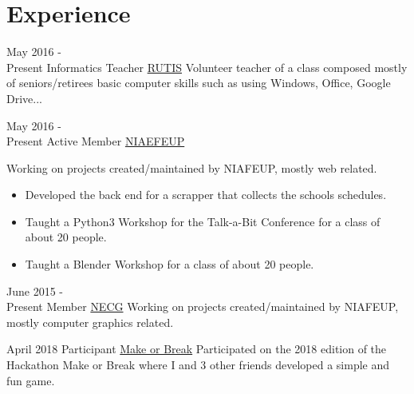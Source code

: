 \documentclass[letterpaper]{twentysecondcv} %
\begin{document}
\section{Experience}




\begin{twenty} %

	\twentyitem
    	{May 2016 - \\ Present}
        {Informatics Teacher}
        {\href{http://www.rutis.pt/intro/home}{RUTIS}}
        {}
        {
        Volunteer teacher of a class composed mostly of seniors/retirees basic computer skills such as using Windows, Office, Google Drive... \newline
        }



	\twentyitem
    	{May 2016 - \\ Present}
        {Active Member}
        {\href{https://ni.fe.up.pt/}{NIAEFEUP}}
        {}
        {
        Working on projects created/maintained by NIAFEUP, mostly web related. \newline
        {\begin{itemize}
        \item Developed the back end for a scrapper that collects the schools schedules. 
        \item Taught a Python3 Workshop for the Talk-a-Bit Conference for a class of about 20 people.
		\item Taught a Blender Workshop for a class of about 20 people. 

    \end{itemize}}
        }
        \newline
        

        
        
    \twentyitem
   		{June 2015 - \\ Present}
        {Member}
        {\href{http://necg.fe.up.pt/}{NECG}}
        {}
        {
         Working on projects created/maintained by NIAFEUP, mostly computer graphics related. \newline
        }
        
        
                        \twentyitem
    	{April 2018}
        {Participant}
        {\href{https://makeorbreak.io/}{Make or Break}}
        {}
        {
        Participated on the 2018 edition of the Hackathon Make or Break where I and 3 other friends developed a simple and fun game.}\newline
        
        

 

        
     
        
\end{twenty}
\end{document}
